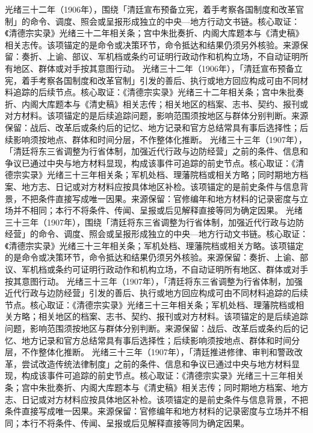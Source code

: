光绪三十二年（1906年），围绕「清廷宣布预备立宪，着手考察各国制度和改革官制」的命令、调度、照会或呈报形成独立的中央—地方行动文书链。核心取证：《清德宗实录》光绪三十二年相关条；宫中朱批奏折、内阁大库题本与《清史稿》相关志传。该项锚定的是命令或决策环节，命令抵达和结果仍须另外核验。来源保留：奏折、上谕、部议、军机档或条约可证明行政动作和机构立场，不自动证明所有地区、群体或对手按其意图行动。
光绪三十二年（1906年），「清廷宣布预备立宪，着手考察各国制度和改革官制」引发的善后、执行或地方回应构成可由不同材料追踪的后续节点。核心取证：《清德宗实录》光绪三十二年相关条；宫中朱批奏折、内阁大库题本与《清史稿》相关志传；相关地区的档案、志书、契约、报刊或对方材料。该项锚定的是后续追踪问题，影响范围须按地区与群体分别判断。来源保留：战后、改革后或条约后的记忆、地方记录和官方总结常具有事后选择性；后续影响须按地点、群体和时间分层，不作整体化推断。
光绪三十三年（1907年），「清廷将东三省调整为行省体制，加强近代行政与边防经营」之前的条件、信息和争议已通过中央与地方材料显现，构成该事件可追踪的前史节点。核心取证：《清德宗实录》光绪三十三年相关条；军机处档、理藩院档或相关方略；同时期地方档案、地方志、日记或对方材料应按具体地区补检。该项锚定的是前史条件与信息背景，不把条件直接写成唯一因果。来源保留：官修编年和地方材料的记录密度与立场并不相同；本行不将条件、传闻、呈报或后见解释直接等同为确定因果。
光绪三十三年（1907年），围绕「清廷将东三省调整为行省体制，加强近代行政与边防经营」的命令、调度、照会或呈报形成独立的中央—地方行动文书链。核心取证：《清德宗实录》光绪三十三年相关条；军机处档、理藩院档或相关方略。该项锚定的是命令或决策环节，命令抵达和结果仍须另外核验。来源保留：奏折、上谕、部议、军机档或条约可证明行政动作和机构立场，不自动证明所有地区、群体或对手按其意图行动。
光绪三十三年（1907年），「清廷将东三省调整为行省体制，加强近代行政与边防经营」引发的善后、执行或地方回应构成可由不同材料追踪的后续节点。核心取证：《清德宗实录》光绪三十三年相关条；军机处档、理藩院档或相关方略；相关地区的档案、志书、契约、报刊或对方材料。该项锚定的是后续追踪问题，影响范围须按地区与群体分别判断。来源保留：战后、改革后或条约后的记忆、地方记录和官方总结常具有事后选择性；后续影响须按地点、群体和时间分层，不作整体化推断。
光绪三十三年（1907年），「清廷推进修律、审判和警政改革，尝试改造传统法律制度」之前的条件、信息和争议已通过中央与地方材料显现，构成该事件可追踪的前史节点。核心取证：《清德宗实录》光绪三十三年相关条；宫中朱批奏折、内阁大库题本与《清史稿》相关志传；同时期地方档案、地方志、日记或对方材料应按具体地区补检。该项锚定的是前史条件与信息背景，不把条件直接写成唯一因果。来源保留：官修编年和地方材料的记录密度与立场并不相同；本行不将条件、传闻、呈报或后见解释直接等同为确定因果。
